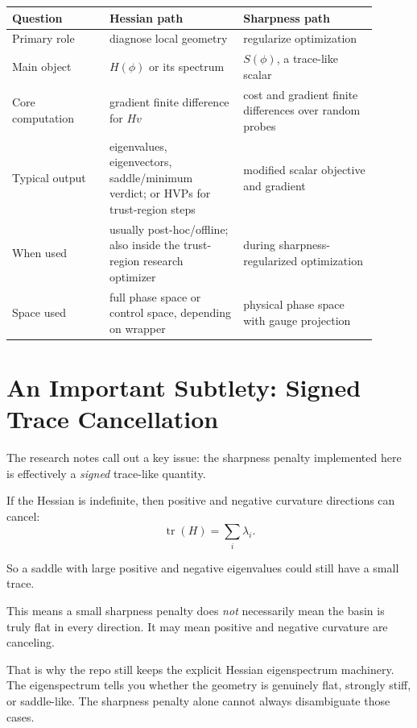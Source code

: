 \documentclass[11pt,letterpaper]{article}
\newcommand{\tr}{\operatorname{tr}}
\begin{document}
\begin{center}
\begin{tabular}{p{0.24\linewidth} p{0.33\linewidth} p{0.33\linewidth}}
\toprule
Question & Hessian path & Sharpness path \\
\midrule
Primary role & diagnose local geometry & regularize optimization \\
Main object & $H(\phi)$ or its spectrum & $S(\phi)$, a trace-like scalar \\
Core computation & gradient finite difference for $Hv$ & cost and gradient finite differences over random probes \\
Typical output & eigenvalues, eigenvectors, saddle/minimum verdict; or HVPs for trust-region steps & modified scalar objective and gradient \\
When used & usually post-hoc/offline; also inside the trust-region research optimizer & during sharpness-regularized optimization \\
Space used & full phase space or control space, depending on wrapper & physical phase space with gauge projection \\
\bottomrule
\end{tabular}
\end{center}

\section{An Important Subtlety: Signed Trace Cancellation}

The research notes call out a key issue: the sharpness penalty implemented here
is effectively a \emph{signed} trace-like quantity.

If the Hessian is indefinite, then positive and negative curvature directions
can cancel:
\[
\tr(H) = \sum_i \lambda_i.
\]

So a saddle with large positive and negative eigenvalues could still have a
small trace.

\begin{warningbox}
This means a small sharpness penalty does \emph{not} necessarily mean the basin
is truly flat in every direction. It may mean positive and negative curvature
are canceling.
\end{warningbox}

That is why the repo still keeps the explicit Hessian eigenspectrum machinery.
The eigenspectrum tells you whether the geometry is genuinely flat, strongly
stiff, or saddle-like. The sharpness penalty alone cannot always disambiguate
those cases.
\end{document}
